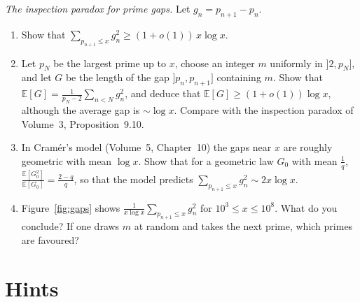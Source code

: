 \begin{exercise}[$\star\star$]\label{pb:inspection}
\emph{The inspection paradox for prime gaps.} Let $g_n=p_{n+1}-p_n$.
\begin{enumerate}[label=(\alph*)]
\item Show that $\sum_{p_{n+1}\le x}g_n^2\ge(1+o(1))\,x\log x$.
\item Let $p_N$ be the largest prime up to $x$, choose an integer $m$ uniformly in $]2,p_N]$, and let $G$ be the length of the gap $]p_n,p_{n+1}]$ containing $m$. Show that
$\mathbb E[G]=\frac1{p_N-2}\sum_{n<N}g_n^2$, and deduce that $\mathbb E[G]\ge(1+o(1))\log x$, although the average gap is $\sim\log x$. Compare with the inspection paradox
of Volume~3, Proposition~9.10.
\item In Cram\'er's model (Volume~5, Chapter~10) the gaps near $x$ are roughly geometric with mean $\log x$. Show that for a geometric law $G_0$ with mean $\frac1q$,
$\frac{\mathbb E[G_0^2]}{\mathbb E[G_0]}=\frac{2-q}q$, so that the model predicts $\sum_{p_{n+1}\le x}g_n^2\sim2x\log x$.
\item Figure~\ref{fig:gaps} shows $\frac1{x\log x}\sum_{p_{n+1}\le x}g_n^2$ for $10^3\le x\le10^8$. What do you conclude? If one draws $m$ at random and takes the next prime,
which primes are favoured?
\end{enumerate}
\end{exercise}

\section{Hints}


